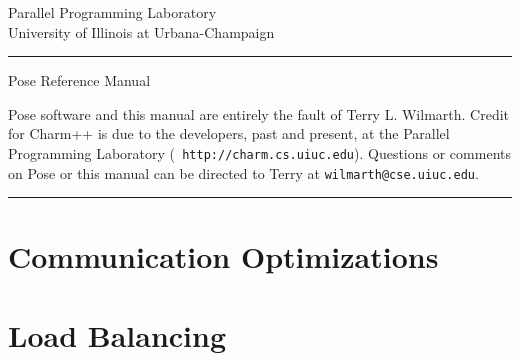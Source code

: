 \documentclass[10pt]{article}
\newcommand{\pose}{{\sc Pose}}
\begin{document}
\begin{titlepage}
 \begin{flushright}
   {\Large
     Parallel Programming Laboratory\\
     University of Illinois at Urbana-Champaign\\
   }
 \end{flushright}
 \rule{\textwidth}{3pt}
 \vspace{\fill}
 \begin{flushright}
   \textsf{\Huge \pose{} Reference Manual \\}
 \end{flushright}
 \vspace{\fill}
 {\small \pose{} software and this manual are entirely the fault of Terry
L. Wilmarth.  Credit for Charm++ is due to the developers, past and
present, at the Parallel Programming Laboratory ({\tt
http://charm.cs.uiuc.edu}).  Questions or comments on \pose{} or this
manual can be directed to Terry at {\tt wilmarth@cse.uiuc.edu}.
} \\
 \rule{\textwidth}{3pt}
\end{titlepage}

\tableofcontents
\newpage





\section{Communication Optimizations}
\section{Load Balancing}

\end{document}
